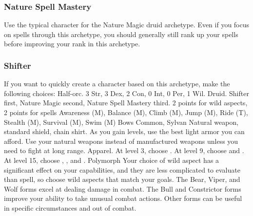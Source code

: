         \subsubsection{Nature Spell Mastery}
            Use the typical character for the Nature Magic druid archetype.
            Even if you focus on spells through this archetype, you should generally still rank up your spells before improving your rank in this archetype.

        \subsubsection{Shifter}
            If you want to quickly create a character based on this archetype, make the following choices:
             Half-orc.
             3 Str, 3 Dex, 2 Con, 0 Int, 0 Per, 1 Wil.
             Druid.
             Shifter first, Nature Magic second, Nature Spell Mastery third.
             2 points for wild aspects, 2 points for spells
             Awareness (M), Balance (M), Climb (M), Jump (M), Ride (T), Stealth (M), Survival (M), Swim (M)
             Bows
             Common, Sylvan
             Natural weapon, standard shield, chain shirt. As you gain levels, use the best light armor you can afford.
            Use your natural weapons instead of manufactured weapons unless you need to fight at long range.
             Apparel.
                At level 3, choose .
                At level 9, choose  and .
                At level 15, choose , , and .
             Polymorph
             Your choice of wild aspect has a significant effect on your capabilities, and they are less complicated to evaluate than spell, so choose wild aspects that match your goals.
            The Bear, Viper, and Wolf forms excel at dealing damage in combat.
            The Bull and Constrictor forms improve your ability to take unusual combat actions.
            Other forms can be useful in specific circumstances and out of combat.
